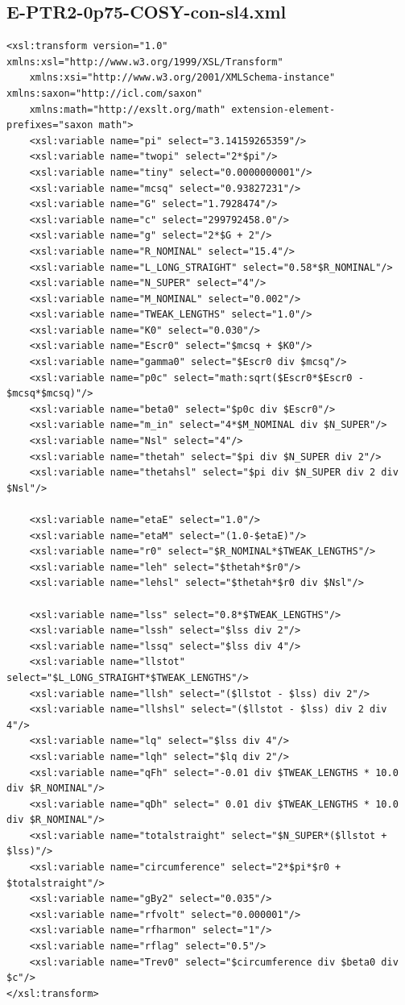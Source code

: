 \documentclass[]{article}
\begin{document}
\subsection{E-PTR2-0p75-COSY-con-sl4.xml}
\begin{verbatim}
<xsl:transform version="1.0" xmlns:xsl="http://www.w3.org/1999/XSL/Transform"
    xmlns:xsi="http://www.w3.org/2001/XMLSchema-instance" xmlns:saxon="http://icl.com/saxon"
    xmlns:math="http://exslt.org/math" extension-element-prefixes="saxon math">
    <xsl:variable name="pi" select="3.14159265359"/>
    <xsl:variable name="twopi" select="2*$pi"/>
    <xsl:variable name="tiny" select="0.0000000001"/>
    <xsl:variable name="mcsq" select="0.93827231"/>
    <xsl:variable name="G" select="1.7928474"/>
    <xsl:variable name="c" select="299792458.0"/>
    <xsl:variable name="g" select="2*$G + 2"/>
    <xsl:variable name="R_NOMINAL" select="15.4"/>
    <xsl:variable name="L_LONG_STRAIGHT" select="0.58*$R_NOMINAL"/>
    <xsl:variable name="N_SUPER" select="4"/>
    <xsl:variable name="M_NOMINAL" select="0.002"/>
    <xsl:variable name="TWEAK_LENGTHS" select="1.0"/>
    <xsl:variable name="K0" select="0.030"/>
    <xsl:variable name="Escr0" select="$mcsq + $K0"/>
    <xsl:variable name="gamma0" select="$Escr0 div $mcsq"/>
    <xsl:variable name="p0c" select="math:sqrt($Escr0*$Escr0 - $mcsq*$mcsq)"/>
    <xsl:variable name="beta0" select="$p0c div $Escr0"/>  
    <xsl:variable name="m_in" select="4*$M_NOMINAL div $N_SUPER"/>
    <xsl:variable name="Nsl" select="4"/>
    <xsl:variable name="thetah" select="$pi div $N_SUPER div 2"/>
    <xsl:variable name="thetahsl" select="$pi div $N_SUPER div 2 div $Nsl"/>

    <xsl:variable name="etaE" select="1.0"/>
    <xsl:variable name="etaM" select="(1.0-$etaE)"/>
    <xsl:variable name="r0" select="$R_NOMINAL*$TWEAK_LENGTHS"/>
    <xsl:variable name="leh" select="$thetah*$r0"/>
    <xsl:variable name="lehsl" select="$thetah*$r0 div $Nsl"/>

    <xsl:variable name="lss" select="0.8*$TWEAK_LENGTHS"/>
    <xsl:variable name="lssh" select="$lss div 2"/>
    <xsl:variable name="lssq" select="$lss div 4"/>
    <xsl:variable name="llstot" select="$L_LONG_STRAIGHT*$TWEAK_LENGTHS"/>
    <xsl:variable name="llsh" select="($llstot - $lss) div 2"/>
    <xsl:variable name="llshsl" select="($llstot - $lss) div 2 div 4"/>
    <xsl:variable name="lq" select="$lss div 4"/>
    <xsl:variable name="lqh" select="$lq div 2"/>
    <xsl:variable name="qFh" select="-0.01 div $TWEAK_LENGTHS * 10.0 div $R_NOMINAL"/>
    <xsl:variable name="qDh" select=" 0.01 div $TWEAK_LENGTHS * 10.0 div $R_NOMINAL"/>
    <xsl:variable name="totalstraight" select="$N_SUPER*($llstot + $lss)"/>
    <xsl:variable name="circumference" select="2*$pi*$r0 + $totalstraight"/>
    <xsl:variable name="gBy2" select="0.035"/>
    <xsl:variable name="rfvolt" select="0.000001"/>
    <xsl:variable name="rfharmon" select="1"/>
    <xsl:variable name="rflag" select="0.5"/>
    <xsl:variable name="Trev0" select="$circumference div $beta0 div $c"/>
</xsl:transform>
\end{verbatim}
\end{document}
